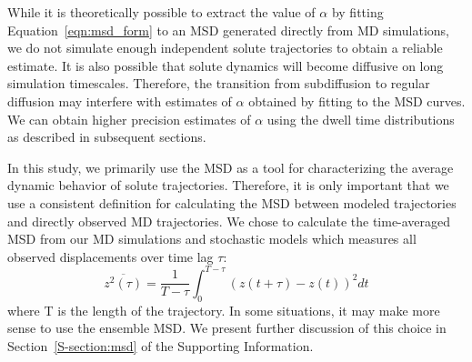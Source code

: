 \documentclass[journal=jctcce,manuscript=article]{achemso}
\begin{document}
  While it is theoretically possible to extract the value of $\alpha$ by fitting
  Equation~\ref{eqn:msd_form} to an MSD generated directly from MD simulations, 
  we do not simulate enough independent solute trajectories to obtain a reliable
  estimate. It is also possible that solute dynamics will become diffusive on
  long simulation timescales. Therefore, the transition from subdiffusion to regular
  diffusion may interfere with estimates of $\alpha$ obtained by fitting to the MSD
  curves. We can obtain higher precision estimates of $\alpha$ using the dwell
  time distributions as described in subsequent sections.
  
  In this study, we primarily use the MSD as a tool for characterizing the average
  dynamic behavior of solute trajectories. Therefore, it is only important that we use a
  consistent definition for calculating the MSD between modeled trajectories and
  directly observed MD trajectories. We chose to calculate the time-averaged MSD from 
  our MD simulations and stochastic models which measures all observed displacements
  over time lag $\tau$: 
  \begin{equation}
  \overline{z^2(\tau)} = \dfrac{1}{T - \tau}\int_{0}^{T - \tau} (z(t + \tau) - z(t))^2 dt
  \label{eqn:tamsd}
  \end{equation}
  where T is the length of the trajectory. In some situations, it may make
  more sense to use the ensemble MSD. We present further discussion of this
  choice in Section~\ref{S-section:msd} of the Supporting Information.

\end{document}
